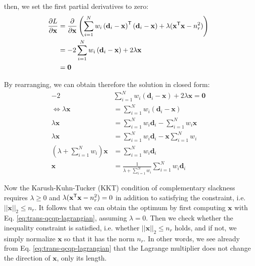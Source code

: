 then, we set the first partial derivatives to zero: 
\begin{equation}
	\begin{aligned}	
		\frac{\partial L}{\partial \mathbf{x}} &= \frac{\partial }{\partial \mathbf{x}} \left( \sum_{i=1}^{N} w_i \left(\mathbf{d}_i - \mathbf{x}\right)^{\mathsf{T}} \left(\mathbf{d}_i - \mathbf{x}\right) + \lambda (
		\mathbf{x}^{\mathsf{T}} \mathbf{x} - n_r^2) \right)\\
		&= - 2\sum_{i=1}^{N} w_i \left(\mathbf{d}_i - \mathbf{x}\right) + 2 \lambda \mathbf{x}\\
		&= \mathbf{0}\\
	\end{aligned}
\end{equation}


By rearranging, we can obtain therefore the solution in closed form:
\begin{equation}
	\label{eq:trans-qcqp-lagrangian}
	\begin{aligned}	
		-2  &\sum_{i=1}^{N}  w_i \left(\mathbf{d}_i - \mathbf{x}\right) + 2 \lambda \mathbf{x} = \mathbf{0}\\
		\iff \lambda \mathbf{x} &= \sum_{i=1}^{N} w_i \left(\mathbf{d}_i - \mathbf{x}\right)\\
		\lambda \mathbf{x} &= \sum_{i=1}^{N}  w_i \mathbf{d}_i  - \sum_{i=1}^{N}  w_i \mathbf{x}\\
		\lambda \mathbf{x} &= \sum_{i=1}^{N}  w_i \mathbf{d}_i  - \mathbf{x} \sum_{i=1}^{N}  w_i\\
		\left( \lambda + \sum_{i=1}^{N}  w_i \right) \mathbf{x} &= \sum_{i=1}^{N} w_i \mathbf{d}_i \\
		\mathbf{x} &= \frac{1}{\lambda + \sum_{i=1}^{N}  w_i} \sum_{i=1}^{N} w_i \mathbf{d}_i 
	\end{aligned}
\end{equation}

Now the Karush-Kuhn-Tucker (KKT) condition of complementary slackness requires $\lambda \geq 0$ and $\lambda (
\mathbf{x}^{\mathsf{T}} \mathbf{x} - n_r^2) = 0$ in addition to satisfying the constraint, i.e. $|| \mathbf{x}||_2 \leq n_r$. It follows that we can obtain the optimum by first computing $\mathbf{x}$ with Eq. \ref{eq:trans-qcqp-lagrangian}, assuming $\lambda = 0$. Then we check whether the inequality constraint is satisfied, i.e. whether $|| \mathbf{x}||_2 \leq n_r$ holds, and if not, we simply normalize $\mathbf{x}$ so that it has the norm $n_r$. In other words, we see already from Eq. \ref{eq:trans-qcqp-lagrangian} that the Lagrange multiplier does not change the direction of $\mathbf{x}$, only its length.


